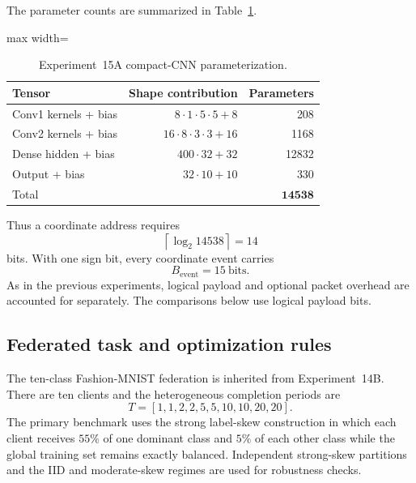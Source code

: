 The parameter counts are summarized in Table~\ref{tab:exp15a-parameters}.
\begin{table}[ht]
\centering
\small
\caption{Experiment~15A compact-CNN parameterization.}
\label{tab:exp15a-parameters}
\begin{adjustbox}{max width=\textwidth}
\begin{tabular}{lrr}
\toprule
Tensor & Shape contribution & Parameters\\
\midrule
Conv1 kernels + bias & $8\cdot1\cdot5\cdot5+8$ & 208\\
Conv2 kernels + bias & $16\cdot8\cdot3\cdot3+16$ & 1168\\
Dense hidden + bias & $400\cdot32+32$ & 12832\\
Output + bias & $32\cdot10+10$ & 330\\
\midrule
Total & & $\mathbf{14538}$\\
\bottomrule
\end{tabular}
\end{adjustbox}
\end{table}
Thus a coordinate address requires
\begin{equation}
\left\lceil\log_2 14538\right\rceil=14
\end{equation}
bits. With one sign bit, every coordinate event carries
\begin{equation}
\boxed{B_{\mathrm{event}}=15\ \mathrm{bits}}.
\end{equation}
As in the previous experiments, logical payload and optional packet overhead are accounted for separately. The comparisons below use logical payload bits.

\subsection{Federated task and optimization rules}

The ten-class Fashion-MNIST federation is inherited from Experiment~14B. There are ten clients and the heterogeneous completion periods are
\begin{equation}
T=[1,1,2,2,5,5,10,10,20,20].
\end{equation}
The primary benchmark uses the strong label-skew construction in which each client receives $55\%$ of one dominant class and $5\%$ of each other class while the global training set remains exactly balanced. Independent strong-skew partitions and the IID and moderate-skew regimes are used for robustness checks.

